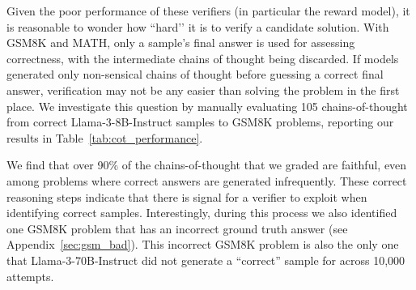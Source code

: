 \documentclass[11pt]{article}
\begin{document}
Given the poor performance of these verifiers (in particular the reward model), it is reasonable to wonder how ``hard’’ it is to verify a candidate solution. With GSM8K and MATH, only a sample’s final answer is used for assessing correctness, with the intermediate chains of thought being discarded. If models generated only non-sensical chains of thought before guessing a correct final answer, verification may not be any easier than solving the problem in the first place. We investigate this question by manually evaluating 105 chains-of-thought from correct Llama-3-8B-Instruct samples to GSM8K problems, reporting our results in Table~\ref{tab:cot_performance}.

We find that over 90\% of the chains-of-thought that we graded are faithful, even among problems where correct answers are generated infrequently.
These correct reasoning steps indicate that there is signal for a verifier to exploit when identifying correct samples. Interestingly, during this process we also identified one GSM8K problem that has an incorrect ground truth answer (see Appendix~\ref{sec:gsm_bad}). 
This incorrect GSM8K problem is also the only one that Llama-3-70B-Instruct did not generate a ``correct'' sample for across 10,000 attempts.


\label{sec:gsm_grading}
\begin{table}[htbp]
\centering
{}
\caption{Human evaluation of the validity of the Chain-of-Thought reasoning in Llama-3-8B-Instruct answers to GSM8K problems. 3 chains of thought were graded per problem. Even for difficult questions, where the model only gets $\leq 10\%$ of samples correct, the CoTs almost always follow valid logical steps. For the model generations and human labels, \href{https://docs.google.com/spreadsheets/d/1D-suvkheNA4fjLsO2TuwHNqwx2TIECmp}{see here}.}
\label{tab:cot_performance}
\end{table}
\end{document}
